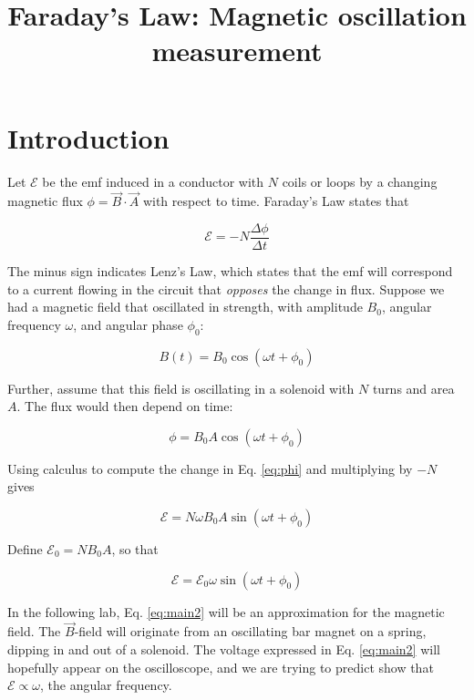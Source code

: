 \documentclass[12pt]{article}
\title{Faraday's Law: Magnetic oscillation measurement}
\begin{document}
\maketitle

\section{Introduction}

Let $\mathcal{E}$ be the emf induced in a conductor with $N$ coils or loops by a changing magnetic flux $\phi = \vec{B} \cdot \vec{A}$ with respect to time.  Faraday's Law states that

\begin{equation}
\mathcal{E} = -N \frac{\Delta\phi}{\Delta t}
\end{equation}

The minus sign indicates Lenz's Law, which states that the emf will correspond to a current flowing in the circuit that \textit{opposes} the change in flux.  Suppose we had a magnetic field that oscillated in strength, with amplitude $B_0$, angular frequency $\omega$, and angular phase $\phi_0$:

\begin{equation}
B(t) = B_0 \cos(\omega t + \phi_0)
\end{equation}

Further, assume that this field is oscillating in a solenoid with $N$ turns and area $A$.  The flux would then depend on time:

\begin{equation}
\phi = B_0 A \cos(\omega t + \phi_0) \label{eq:phi}
\end{equation}

Using calculus to compute the change in Eq. \ref{eq:phi} and multiplying by $-N$ gives

\begin{equation}
\mathcal{E} = N \omega B_0 A \sin(\omega t + \phi_0) \label{eq:main}
\end{equation}

Define $\mathcal{E}_0 = N B_0 A$, so that

\begin{equation}
\mathcal{E} = \mathcal{E}_0 \omega \sin(\omega t + \phi_0) \label{eq:main2}
\end{equation}

In the following lab, Eq. \ref{eq:main2} will be an approximation for the magnetic field.  The $\vec{B}$-field will originate from an oscillating bar magnet on a spring, dipping in and out of a solenoid.  The voltage expressed in Eq. \ref{eq:main2} will hopefully appear on the oscilloscope, and we are trying to predict show that $\mathcal{E} \propto \omega$, the angular frequency.
\end{document}
